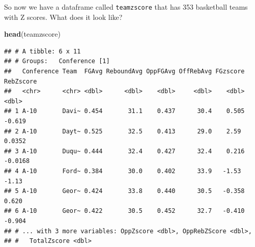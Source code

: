 \documentclass[]{book}
\newenvironment{Shaded}{\begin{snugshade}}{\end{snugshade}}
\newcommand{\DataTypeTok}[1]{\textcolor[rgb]{0.13,0.29,0.53}{#1}}
\newcommand{\DecValTok}[1]{\textcolor[rgb]{0.00,0.00,0.81}{#1}}
\newcommand{\KeywordTok}[1]{\textcolor[rgb]{0.13,0.29,0.53}{\textbf{#1}}}
\newcommand{\NormalTok}[1]{#1}
\newcommand{\OperatorTok}[1]{\textcolor[rgb]{0.81,0.36,0.00}{\textbf{#1}}}
\newcommand{\OtherTok}[1]{\textcolor[rgb]{0.56,0.35,0.01}{#1}}
\newcommand{\StringTok}[1]{\textcolor[rgb]{0.31,0.60,0.02}{#1}}
\begin{document}
\begin{Shaded}
\end{Shaded}

So now we have a dataframe called \texttt{teamzscore} that has 353 basketball teams with Z scores. What does it look like?

\begin{Shaded}
\begin{Highlighting}[]
\KeywordTok{head}\NormalTok{(teamzscore)}
\end{Highlighting}
\end{Shaded}

\begin{verbatim}
## # A tibble: 6 x 11
## # Groups:   Conference [1]
##   Conference Team  FGAvg ReboundAvg OppFGAvg OffRebAvg FGzscore RebZscore
##   <chr>      <chr> <dbl>      <dbl>    <dbl>     <dbl>    <dbl>     <dbl>
## 1 A-10       Davi~ 0.454       31.1    0.437      30.4    0.505   -0.619 
## 2 A-10       Dayt~ 0.525       32.5    0.413      29.0    2.59     0.0352
## 3 A-10       Duqu~ 0.444       32.4    0.427      32.4    0.216   -0.0168
## 4 A-10       Ford~ 0.384       30.0    0.402      33.9   -1.53    -1.13  
## 5 A-10       Geor~ 0.424       33.8    0.440      30.5   -0.358    0.620 
## 6 A-10       Geor~ 0.422       30.5    0.452      32.7   -0.410   -0.904 
## # ... with 3 more variables: OppZscore <dbl>, OppRebZScore <dbl>,
## #   TotalZscore <dbl>
\end{verbatim}
\end{document}

